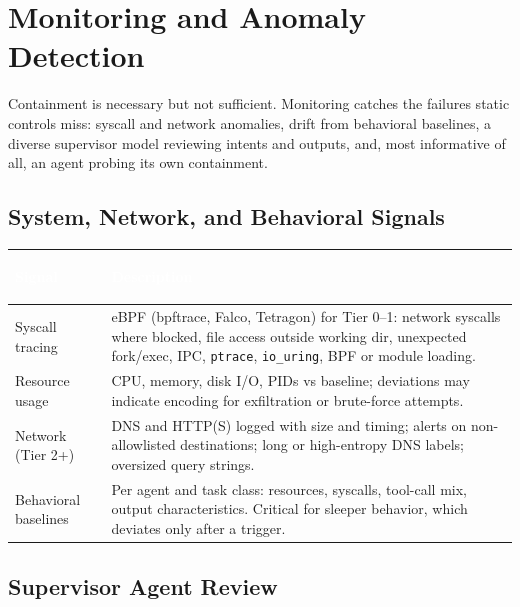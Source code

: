 \documentclass[11pt,letterpaper]{article}
\newcommand{\hrow}{\rowcolor{slategraphite}}
\newcommand{\hdr}[1]{\textcolor{white}{\bfseries\strut #1}}
\begin{document}
\section{Monitoring and Anomaly Detection}
\label{sec:monitoring}

\begin{glance}
Containment is necessary but not sufficient. Monitoring catches the failures static controls miss: syscall and network anomalies, drift from behavioral baselines, a diverse supervisor model reviewing intents and outputs, and, most informative of all, an agent probing its own containment.
\end{glance}

\subsection{System, Network, and Behavioral Signals}

\begin{longtable}{L{3.6cm} L{12.4cm}}
\hrow \hdr{Signal} & \hdr{Description} \\
\endhead
Syscall tracing & eBPF (bpftrace, Falco, Tetragon) for Tier 0--1: network syscalls where blocked, file access outside working dir, unexpected fork/exec, IPC, \texttt{ptrace}, \texttt{io\_uring}, BPF or module loading. \\
Resource usage & CPU, memory, disk I/O, PIDs vs baseline; deviations may indicate encoding for exfiltration or brute-force attempts. \\
Network (Tier 2+) & DNS and HTTP(S) logged with size and timing; alerts on non-allowlisted destinations; long or high-entropy DNS labels; oversized query strings. \\
Behavioral baselines & Per agent and task class: resources, syscalls, tool-call mix, output characteristics. Critical for sleeper behavior, which deviates only after a trigger. \\*
\bottomrule
\end{longtable}

\subsection{Supervisor Agent Review}
\end{document}
